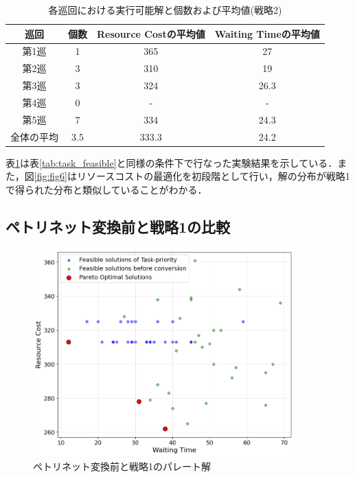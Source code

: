 \begin{table}[ht]
    \centering
    \vspace{-0.3cm}
    \caption{各巡回における実行可能解と個数および平均値(戦略2)}
    \begin{tabular}{|c|c|c|c|}
        \hline
         巡回 & 個数 & Resource Costの平均値 & Waiting Timeの平均値 \\
        \hline
        第1巡 & 1 & 365 & 27 \\
        \hline
        第2巡 & 3 & 310 & 19 \\
        \hline
        第3巡 & 3 & 324 & 26.3 \\
        \hline
        第4巡 & 0 & - & - \\
        \hline
        第5巡 & 7 & 334 & 24.3 \\
        \hline
        全体の平均 & 3.5 & 333.3 & 24.2 \\
        \hline
    \end{tabular}
    \label{tab:cost_feasible}
\end{table}

表\ref{tab:cost_feasible}は表\ref{tab:task_feasible}と同様の条件下で行なった実験結果を示している．また，図\ref{fig:fig6}はリソースコストの最適化を初段階として行い，解の分布が戦略1で得られた分布と類似していることがわかる．

\subsection{ペトリネット変換前と戦略1の比較}
\begin{figure}[H]
    \centering
    \includegraphics[width=0.8\linewidth, height=8cm]{./images/task_and_before.png}
    \caption{ペトリネット変換前と戦略1のパレート解}
    \label{fig:fig7}
\end{figure}


